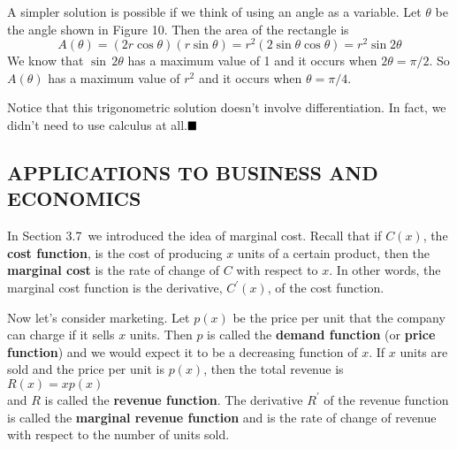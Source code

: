 \documentclass{sebase}
\begin{document}
\begin{SolutionOne}[2]
A simpler solution is
possible if we think of using an angle as a variable. Let $\theta $ be the
angle shown in Figure 10. Then the area of the rectangle is 
\[
A(\theta )=(2r\cos \theta )(r\sin \theta )=r^{2}(2\sin \theta \cos \theta
)=r^{2}\sin 2\theta 
\]%
\noindent We know that $\sin \,2\theta $ has a maximum value of 1 and it
occurs when $2\theta =\pi /2$. So $A(\theta )$ has a maximum value of $r^{2}$
and it occurs when $\theta =\pi /4$.

Notice that this trigonometric solution doesn't involve differentiation. In
fact, we didn't need to use calculus at all.$\vspace{-12pt}\blacksquare $
\end{SolutionOne}

\subsection{APPLICATIONS TO BUSINESS AND ECONOMICS\protect\vspace*{-6pt}}

\enlargethispage{12pt}%
In Section 3.7\ we introduced the idea of marginal cost. Recall that if $%
C(x) $, the \textbf{cost function}, is the cost of producing $x$ units of a
certain product, then the \textbf{marginal cost} is the rate of change of $C$
with respect to $x$. In other words, the marginal cost function is the
derivative, $C^{\prime }(x)$, of the cost function.

Now let's consider marketing. Let $p(x)$ be the price per unit that the
company can charge if it sells $x$ units. Then $p$ is called the \textbf{%
demand function} (or \textbf{price function}) and we would expect it to be a
decreasing function of $x$. If $x$ units are sold and the \pagebreak
\linebreak price per unit is $p(x)$, then the total revenue is\\[6pt]
\hspace*{\fill}$R(x)=xp(x)$\hspace*{\fill}\\[6pt]
and $R$ is called the \textbf{revenue function}. The derivative $R^{\prime }$
of the revenue function is called the \textbf{marginal revenue function} and
is the rate of change of revenue with respect to the number of units sold.
\end{document}
